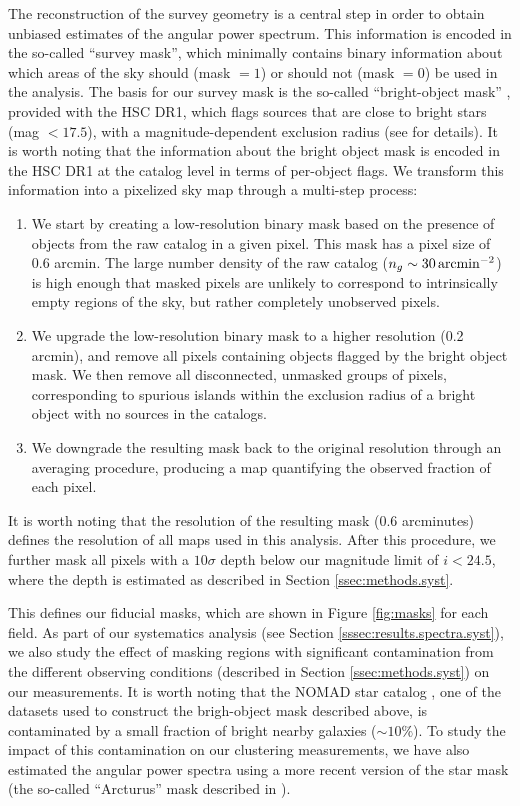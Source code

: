 \documentclass[a4paper,11pt]{article}
\begin{document}
    The reconstruction of the survey geometry is a central step in order to obtain unbiased estimates of the angular power spectrum. This information is encoded in the so-called ``survey mask'', which minimally contains binary information about which areas of the sky should (mask $=1$) or should not (mask $=0$) be used in the analysis. The basis for our survey mask is the so-called ``bright-object mask'' \cite{2018PASJ...70S...7C}, provided with the HSC DR1, which flags sources that are close to bright stars (mag $<17.5$), with a magnitude-dependent exclusion radius (see \cite{2018PASJ...70S...7C} for details). It is worth noting that the information about the bright object mask is encoded in the HSC DR1 at the catalog level in terms of per-object flags. We transform this information into a pixelized sky map through a multi-step process:
    \begin{enumerate}
      \item We start by creating a low-resolution binary mask based on the presence of objects from the raw catalog in a given pixel. This mask has a pixel size of 0.6 arcmin. The large number density of the raw catalog  ($n_g\sim30\,{\rm arcmin}^{-2}$) is high enough that masked pixels are unlikely to correspond to intrinsically empty regions of the sky, but rather completely unobserved pixels.
      \item We upgrade the low-resolution binary mask to a higher resolution (0.2 arcmin), and remove all pixels containing objects flagged by the bright object mask. We then remove all disconnected, unmasked groups of pixels, corresponding to spurious islands within the exclusion radius of a bright object with no sources in the catalogs.
      \item We downgrade the resulting mask back to the original resolution through an averaging procedure, producing a map quantifying the observed fraction of each pixel.
    \end{enumerate}
    It is worth noting that the resolution of the resulting mask ($0.6$ arcminutes) defines the resolution of all maps used in this analysis. After this procedure, we further mask all pixels with a $10\sigma$ depth below our magnitude limit of $i<24.5$, where the depth is estimated as described in Section \ref{ssec:methods.syst}.

    This defines our fiducial masks, which are shown in Figure \ref{fig:masks} for each field. As part of our systematics analysis (see Section \ref{sssec:results.spectra.syst}), we also study the effect of masking regions with significant contamination from the different observing conditions (described in Section \ref{ssec:methods.syst}) on our measurements. It is worth noting that the NOMAD star catalog \cite{2004AAS...205.4815Z}, one of the datasets used to construct the brigh-object mask described above, is contaminated by a small fraction of bright nearby galaxies ($\sim10\%$). To study the impact of this contamination on our clustering measurements, we have also estimated the angular power spectra using a more recent version of the star mask (the so-called ``Arcturus'' mask described in \cite{2018PASJ...70S...7C}).
\end{document}
